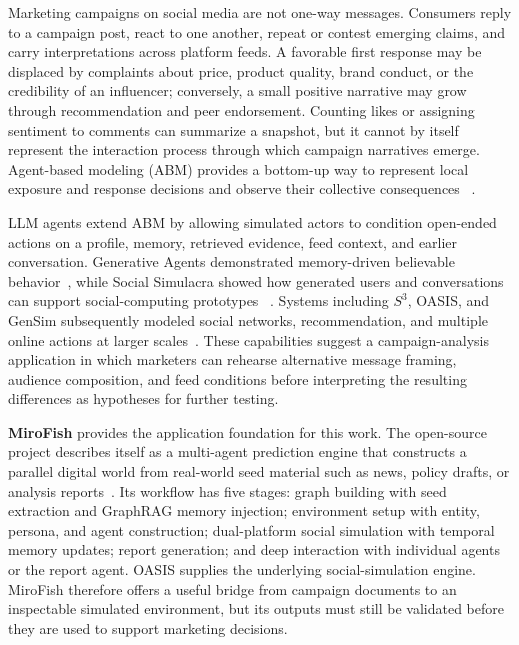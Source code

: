 \documentclass[conference]{IEEEtran}
\begin{document}
Marketing campaigns on social media are not one-way messages. Consumers reply
to a campaign post, react to one another, repeat or contest emerging claims,
and carry interpretations across platform feeds. A favorable first response
may be displaced by complaints about price, product quality, brand conduct, or
the credibility of an influencer; conversely, a small positive narrative may
grow through recommendation and peer endorsement. Counting likes or assigning
sentiment to comments can summarize a snapshot, but it cannot by itself
represent the interaction process through which campaign narratives emerge.
Agent-based modeling (ABM) provides a bottom-up way to represent local exposure
and response decisions and observe their collective consequences
~\cite{macal2010tutorial}.

LLM agents extend ABM by allowing simulated actors to condition open-ended
actions on a profile, memory, retrieved evidence, feed context, and earlier
conversation. Generative Agents demonstrated memory-driven believable
behavior~\cite{park2023generative}, while Social Simulacra showed how generated
users and conversations can support social-computing prototypes
~\cite{park2022social}. Systems including $S^3$, OASIS, and GenSim subsequently
modeled social networks, recommendation, and multiple online actions at larger
scales~\cite{gao2023s3,yang2024oasis,tang2025gensim}. These capabilities suggest
a campaign-analysis application in which marketers can rehearse alternative
message framing, audience composition, and feed conditions before interpreting
the resulting differences as hypotheses for further testing.

\textbf{MiroFish} provides the application foundation for this work. The
open-source project describes itself as a multi-agent prediction engine that
constructs a parallel digital world from real-world seed material such as
news, policy drafts, or analysis reports~\cite{mirofish2026}. Its workflow has
five stages: graph building with seed extraction and GraphRAG memory injection;
environment setup with entity, persona, and agent construction; dual-platform
social simulation with temporal memory updates; report generation; and deep
interaction with individual agents or the report agent. OASIS supplies the
underlying social-simulation engine. MiroFish therefore offers a useful bridge
from campaign documents to an inspectable simulated environment, but its
outputs must still be validated before they are used to support marketing
decisions.
\end{document}
